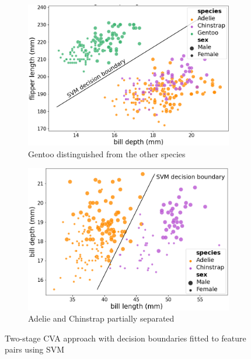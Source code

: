 \documentclass[a4paper, 11pt]{article}
\begin{document}
\begin{figure}[!ht]
    \vspace{-0.5\baselineskip} %
    \begin{subfigure}{0.47\textwidth}
    \centering
    \includegraphics[width=1\textwidth]{sup_fliplen_billdepth.png} %
    \vspace{-1.2\baselineskip} %
    \caption{ Gentoo distinguished from the other species}
    \vspace{-1.5\baselineskip} %
    \label{fig:CVA_part_a}
  \end{subfigure}
  \hfill
  \begin{subfigure}{0.47\textwidth}
    \centering
    \includegraphics[width=1\textwidth]{sup_billlen_billdepth.png} %
    \vspace{-1.2\baselineskip} %
    \caption{ Adelie and Chinstrap partially separated}
    \vspace{-1.5\baselineskip} %
    \label{fig:CVA_part_b}
  \end{subfigure}
  \vspace{1\baselineskip} %
  \caption{\centering\linespread{0.8}\selectfont Two-stage CVA approach with decision boundaries fitted to feature pairs using SVM}
  \label{fig:CVA}
  \vspace{-2\baselineskip} %
\end{figure}
\end{document}
